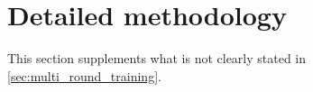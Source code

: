 \clearpage
\setcounter{page}{1}
\maketitlesupplementary



\section{Detailed methodology}
\label{detailed_method}

This section supplements what is not clearly stated in \cref{sec:multi_round_training}.

